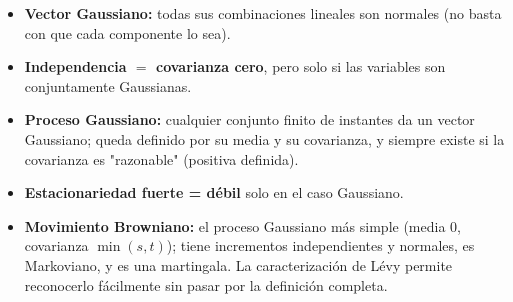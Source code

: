 \documentclass[10pt]{book}
\begin{document}
\begin{itemize}
    \item \textbf{Vector Gaussiano:} todas sus combinaciones lineales son normales (no basta con que cada componente lo sea).
    \item \textbf{Independencia $=$ covarianza cero}, pero solo si las variables son conjuntamente Gaussianas.
    \item \textbf{Proceso Gaussiano:} cualquier conjunto finito de instantes da un vector Gaussiano; queda definido por su media y su covarianza, y siempre existe si la covarianza es "razonable" (positiva definida).
    \item \textbf{Estacionariedad fuerte = débil} solo en el caso Gaussiano.
    \item \textbf{Movimiento Browniano:} el proceso Gaussiano más simple (media 0, covarianza $\min(s,t)$); tiene incrementos independientes y normales, es Markoviano, y es una martingala. La caracterización de Lévy permite reconocerlo fácilmente sin pasar por la definición completa.
\end{itemize}


\end{document}
